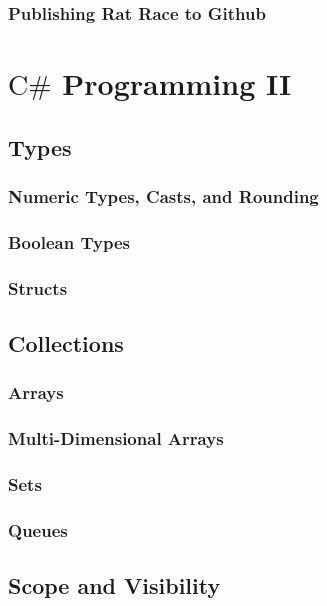 \documentclass[12pt]{amsbook}
\theoremstyle{definition}
\theoremstyle{remark}
\numberwithin{figure}{chapter}
\numberwithin{table}{chapter}
\numberwithin{section}{chapter}
\numberwithin{equation}{section}
\newcommand{\csharp}{\ensuremath{\mbox{C}\#}\xspace}
\begin{document}
\subsection{Publishing Rat Race to Github}

\chapter{\csharp Programming II}

\section{Types}

\subsection{Numeric Types, Casts, and Rounding}

\subsection{Boolean Types}

\subsection{Structs}

\section{Collections}
\subsection{Arrays}


\subsection{Multi-Dimensional Arrays}

\subsection{Sets}

\subsection{Queues}

\section{Scope and Visibility}
\end{document}

